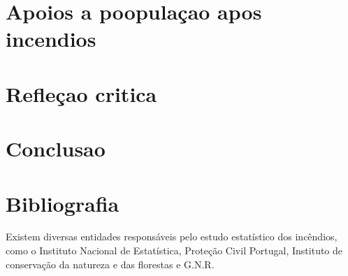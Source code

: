 \documentclass[a4paper,11pt,onecloumn,oneside]{article}
\begin{document}
\part{Apoios a poopulaçao apos incendios}

\part{Refleçao critica}

\part{Conclusao}

\part{Bibliografia}

Existem diversas entidades responsáveis pelo estudo estatístico dos incêndios, como o Instituto Nacional de Estatística, Proteção Civil Portugal, Instituto de conservação da natureza e das florestas e G.N.R.
\end{document}
